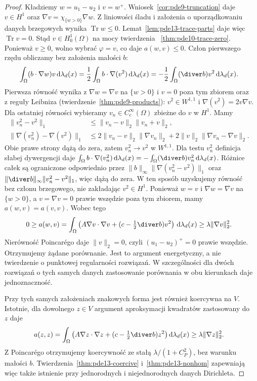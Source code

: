 \begin{proof}
Kładziemy $w=u_1-u_2$ i $v=w^+$.
Wniosek~\ref{cor:pde9-truncation} daje $v\in H^1$
oraz $\nabla v=\chi_{\{w>0\}}\nabla w$.
Z liniowości śladu i założenia o uporządkowaniu danych
brzegowych wynika $\operatorname{Tr}w\le0$.
Lemat~\ref{lem:pde13-trace-parts} daje więc $\operatorname{Tr}v=0$.
Stąd $v\in H_0^1(\Omega)$ na mocy twierdzenia
~\ref{thm:pde10-trace-zero}.
Ponieważ $v\ge0$, wolno wybrać $\varphi=v$, co daje
$a(w,v)\le0$.
Człon pierwszego rzędu obliczamy bez założenia małości $b$:
\[
 \int_\Omega (b\cdot\nabla w)v\,\mathrm d\lambda_d(x)
 =\frac12\int_\Omega b\cdot\nabla(v^2)\,\mathrm d\lambda_d(x)
 =-\frac12\int_\Omega(\diver b)v^2\,\mathrm d\lambda_d(x).
\]
Pierwsza równość wynika z $\nabla w=\nabla v$ na $\{w>0\}$
i $v=0$ poza tym zbiorem oraz z reguły Leibniza
(twierdzenie~\ref{thm:pde9-products}): $v^2\in W^{1,1}$
i $\nabla(v^2)=2v\nabla v$.
Dla ostatniej równości wybieramy $v_n\in C_c^\infty(\Omega)$
zbieżne do $v$ w $H^1$. Mamy
\begin{align*}
 \|v_n^2-v^2\|_1
 &\le\|v_n-v\|_2\|v_n+v\|_2,\\
 \|\nabla(v_n^2)-\nabla(v^2)\|_1
 &\le 2\|v_n-v\|_2\|\nabla v_n\|_2
 +2\|v\|_2\|\nabla v_n-\nabla v\|_2.
\end{align*}
Obie prawe strony dążą do zera, zatem $v_n^2\to v^2$
w $W^{1,1}$. Dla testu $v_n^2$ definicja słabej dywergencji
daje
$\int_\Omega b\cdot\nabla(v_n^2)\,\mathrm d\lambda_d(x)
=-\int_\Omega(\diver b)v_n^2\,\mathrm d\lambda_d(x)$.
Różnice całek są ograniczone odpowiednio przez
$\|b\|_\infty\|\nabla(v_n^2-v^2)\|_1$
oraz $\|\diver b\|_\infty\|v_n^2-v^2\|_1$,
więc dążą do zera. W ten sposób uzyskujemy równość
bez członu brzegowego, nie zakładając $v^2\in H^1$.
Ponieważ $w=v$ i $\nabla w=\nabla v$ na $\{w>0\}$,
a $v=\nabla v=0$ prawie wszędzie poza tym zbiorem,
mamy $a(w,v)=a(v,v)$. Wobec tego
\[
 0\ge a(w,v)=\int_\Omega\left(A\nabla v\cdot\nabla v+
 (c-\tfrac12\diver b)v^2\right)\,\mathrm d\lambda_d(x)
 \ge\lambda\|\nabla v\|_2^2.
\]
Nierówność Poincarégo daje $\|v\|_2=0$, czyli
$(u_1-u_2)^+=0$ prawie wszędzie. Otrzymujemy żądane porównanie.
Jest to argument energetyczny, a nie twierdzenie o punktowej
regularności rozwiązań. W szczególności dla dwóch rozwiązań
o tych samych danych zastosowanie porównania w obu kierunkach
daje jednoznaczność.

Przy tych samych założeniach znakowych forma jest również
koercywna na $V$. Istotnie, dla dowolnego $z\in V$ argument
aproksymacji kwadratów zastosowany do $z$ daje
\[
 a(z,z)=\int_\Omega
 \big(A\nabla z\cdot\nabla z+(c-\tfrac12\diver b)z^2\big)
 \,\mathrm d\lambda_d(x)
 \ge\lambda\|\nabla z\|_2^2.
\]
Z Poincarégo otrzymujemy koercywność ze stałą
$\lambda/(1+C_P^2)$, bez warunku małości $b$.
Twierdzenia~\ref{thm:pde13-coercive} i~\ref{thm:pde13-nonhom}
zapewniają więc także istnienie przy jednorodnych i niejednorodnych
danych Dirichleta.
\end{proof}

